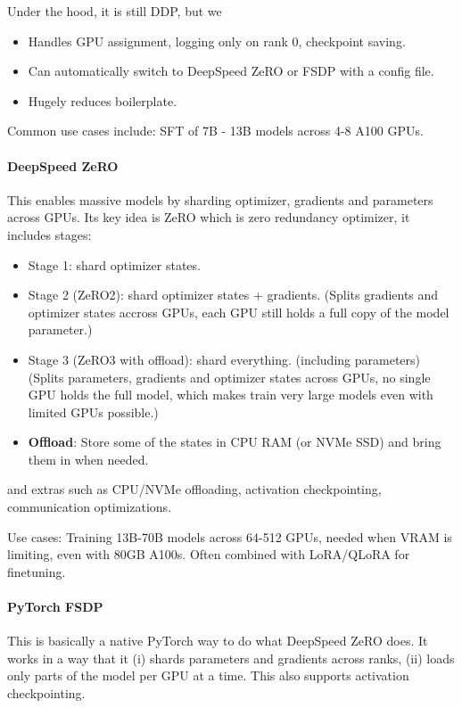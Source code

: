 \documentclass[11pt]{article}  %
\begin{document}
Under the hood, it is still DDP, but we 
\begin{itemize}
  \item Handles GPU assignment, logging only on rank $0$, checkpoint saving.
  \item Can automatically switch to DeepSpeed ZeRO or FSDP with a config file.
  \item Hugely reduces boilerplate.
\end{itemize}

Common use cases include: SFT of 7B - 13B models across 4-8 A100 GPUs.

\paragraph{DeepSpeed ZeRO}
This enables massive models by sharding optimizer, gradients and parameters across GPUs.
Its key idea is ZeRO which is zero redundancy optimizer, it includes stages:
\begin{itemize}
  \item Stage 1: shard optimizer states. 
  \item Stage 2 (ZeRO2): shard optimizer states + gradients. (Splits gradients and optimizer states accross GPUs, each GPU still holds a full copy of the model parameter.)
  \item Stage 3 (ZeRO3 with offload): shard everything. (including parameters) (Splits parameters, gradients and optimizer states across GPUs, no single GPU holds the full model, which makes train very large models even with limited GPUs possible.)
  
  \item \textbf{Offload}: Store some of the states in CPU RAM (or NVMe SSD) and bring them in when needed. 
\end{itemize}
and extras such as CPU/NVMe offloading, activation checkpointing, communication optimizations.

Use cases: Training 13B-70B models across 64-512 GPUs, needed when VRAM is limiting, even with 80GB A100s. 
Often combined with LoRA/QLoRA for finetuning.


\paragraph{PyTorch FSDP}
This is basically a native PyTorch way to do what DeepSpeed ZeRO does.
It works in a way that it (i) shards parameters and gradients across ranks, (ii) loads only parts of the model per GPU at a time. 
This also supports activation checkpointing.
\end{document}
